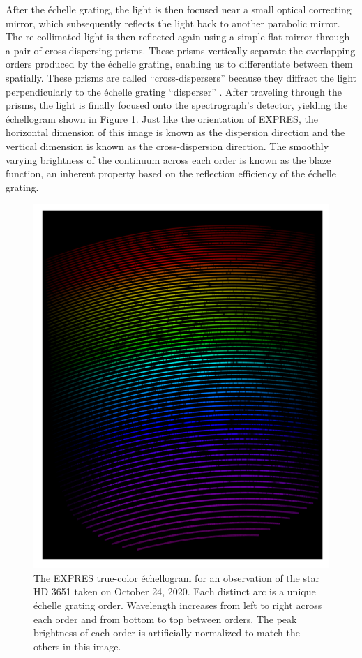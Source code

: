 After the \'echelle grating, the light is then focused near a small optical correcting mirror, which subsequently reflects the light back to another parabolic mirror. The re-collimated light is then reflected again using a simple flat mirror through a pair of cross-dispersing prisms. These prisms vertically separate the overlapping orders produced by the \'echelle grating, enabling us to differentiate between them spatially. These prisms are called ``cross-dispersers'' because they diffract the light perpendicularly to the \'echelle grating ``disperser'' . After traveling through the prisms, the light is finally focused onto the spectrograph's detector, yielding the \'echellogram shown in Figure \ref{fig:expres-format}. Just like the orientation of EXPRES, the horizontal dimension of this image is known as the dispersion direction and the vertical dimension is known as the cross-dispersion direction. The smoothly varying brightness of the continuum across each order is known as the blaze function, an inherent property based on the reflection efficiency of the \'echelle grating.

\begin{figure}
    \centering
    \includegraphics[width=\textwidth]{figures-1/expres-format.pdf}
    \caption[The EXPRES \'Echelleogram]{The EXPRES true-color \'echellogram for an observation of the star HD 3651 taken on October 24, 2020. Each distinct arc is a unique \'echelle grating order. Wavelength increases from left to right across each order and from bottom to top between orders. The peak brightness of each order is artificially normalized to match the others in this image.}
    \label{fig:expres-format}
\end{figure}

